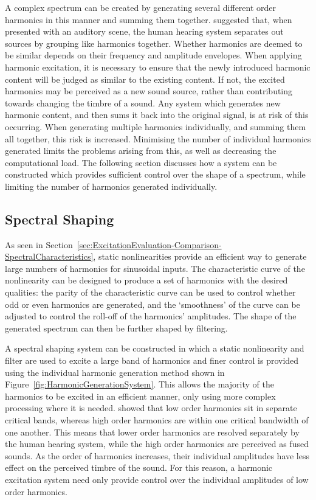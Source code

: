 		A complex spectrum can be created by generating several different order harmonics in this manner and
		summing them together. \citet{bregman1994auditory} suggested that, when presented with an auditory scene,
		the human hearing system separates out sources by grouping like harmonics together. Whether harmonics are
		deemed to be similar depends on their frequency and amplitude envelopes. When applying harmonic excitation,
		it is necessary to ensure that the newly introduced harmonic content will be judged as similar to the
		existing content. If not, the excited harmonics may be perceived as a new sound source, rather than
		contributing towards changing the timbre of a sound. Any system which generates new harmonic content, and
		then sums it back into the original signal, is at risk of this occurring. When generating multiple
		harmonics individually, and summing them all together, this risk is increased. Minimising the number of
		individual harmonics generated limits the problems arising from this, as well as decreasing the
		computational load. The following section discusses how a system can be constructed which provides
		sufficient control over the shape of a spectrum, while limiting the number of harmonics generated
		individually.
		
	\subsection{Spectral Shaping}
	\label{sec:FeatureControl-Systems-SpectralShaping}
		As seen in Section~\ref{sec:ExcitationEvaluation-Comparison-SpectralCharacteristics}, static nonlinearities
		provide an efficient way to generate large numbers of harmonics for sinusoidal inputs. The characteristic
		curve of the nonlinearity can be designed to produce a set of harmonics with the desired qualities: the
		parity of the characteristic curve can be used to control whether odd or even harmonics are generated, and
		the `smoothness' of the curve can be adjusted to control the roll-off of the harmonics' amplitudes. The
		shape of the generated spectrum can then be further shaped by filtering.

		A spectral shaping system can be constructed in which a static nonlinearity and filter are used to excite a
		large band of harmonics and finer control is provided using the individual harmonic generation method shown
		in Figure~\ref{fig:HarmonicGenerationSystem}. This allows the majority of the harmonics to be excited in an
		efficient manner, only using more complex processing where it is needed. \citet{howard2009acoustics} showed
		that low order harmonics sit in separate critical bands, whereas high order harmonics are within one
		critical bandwidth of one another. This means that lower order harmonics are resolved separately by the
		human hearing system, while the high order harmonics are perceived as fused sounds. As the order of
		harmonics increases, their individual amplitudes have less effect on the perceived timbre of the sound. For
		this reason, a harmonic excitation system need only provide control over the individual amplitudes of low
		order harmonics. 

